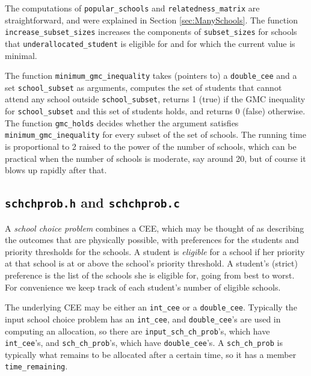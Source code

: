 \documentclass[12pt]{article}
\theoremstyle{definition}
\begin{document}
\begin{appendix}
The computations of \texttt{popular\_schools} and
\texttt{relatedness\_matrix} are straightforward, and were explained
in Section \ref{sec:ManySchools}.  The function
\texttt{increase\_subset\_sizes} increases the components of
\texttt{subset\_sizes} for schools that
\texttt{underallocated\_student} is eligible for and for which the
current value is minimal.

The function \texttt{minimum\_gmc\_inequality} takes (pointers to) a
\texttt{double\_cee} and a set \texttt{school\_subset} as arguments,
computes the set of students that cannot attend any school outside
\texttt{school\_subset}, returns 1 (true) if the GMC inequality for
\texttt{school\_subset} and this set of students holds, and returns 0
(false) otherwise. The function \texttt{gmc\_holds} decides whether
the argument satisfies \texttt{minimum\_gmc\_inequality} for every
subset of the set of schools.  The running time is proportional to 2
raised to the power of the number of schools, which can be practical
when the number of schools is moderate, say around 20, but of course
it blows up rapidly after that.

\subsection{\texttt{schchprob.h} and \texttt{schchprob.c}}

A \emph{school choice problem} combines a CEE, which may be thought of
as describing the outcomes that are physically possible, with
preferences for the students and priority thresholds for the schools.
A student is \emph{eligible} for a school if her priority at that
school is at or above the school's priority threshold. A student's
(strict) preference is the list of the schools she is eligible for,
going from best to worst.  For convenience we keep track of each
student's number of eligible schools.

The underlying CEE may be either an \texttt{int\_cee} or a
\texttt{double\_cee}.  Typically the input school choice problem has
an \texttt{int\_cee}, and \texttt{double\_cee}'s are used in computing
an allocation, so there are \texttt{input\_sch\_ch\_prob}'s, which
have \texttt{int\_cee}'s, and \texttt{sch\_ch\_prob}'s, which have
\texttt{double\_cee}'s.  A \texttt{sch\_ch\_prob} is typically what
remains to be allocated after a certain time, so it has a member
\texttt{time\_remaining}.


\end{appendix}
\end{document}
